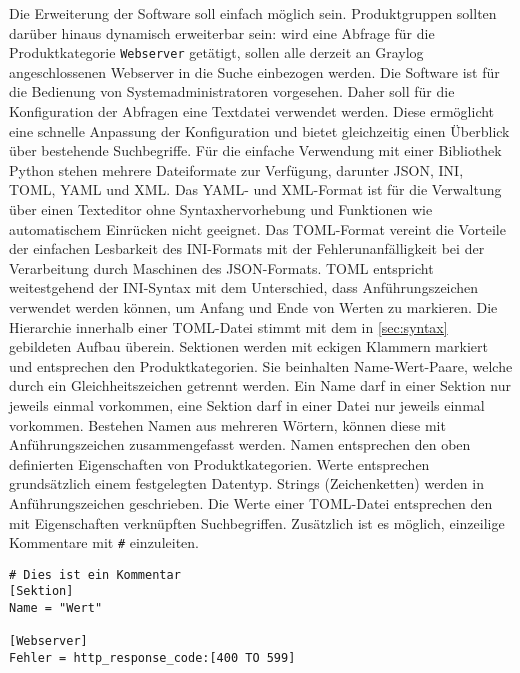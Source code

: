 Die Erweiterung der Software soll einfach möglich sein. Produktgruppen sollten darüber hinaus dynamisch erweiterbar sein: wird eine Abfrage für die Produktkategorie \lstinline{Webserver} getätigt, sollen alle derzeit an Graylog angeschlossenen Webserver in die Suche einbezogen werden. Die Software ist für die Bedienung von Systemadministratoren vorgesehen. Daher soll für die Konfiguration der Abfragen eine Textdatei verwendet werden. Diese ermöglicht eine schnelle Anpassung der Konfiguration und bietet gleichzeitig einen Überblick über bestehende Suchbegriffe. Für die einfache Verwendung mit einer Bibliothek Python stehen mehrere Dateiformate zur Verfügung, darunter JSON, INI, TOML, YAML und XML. Das YAML- und XML-Format ist für die Verwaltung über einen Texteditor ohne Syntaxhervorhebung und Funktionen wie automatischem Einrücken nicht geeignet. Das TOML-Format vereint die Vorteile der einfachen Lesbarkeit des INI-Formats mit der Fehlerunanfälligkeit bei der Verarbeitung durch Maschinen des JSON-Formats. TOML entspricht weitestgehend der INI-Syntax mit dem Unterschied, dass Anführungszeichen verwendet werden können, um Anfang und Ende von Werten zu markieren. Die Hierarchie innerhalb einer TOML-Datei stimmt mit dem in \autoref{sec:syntax} gebildeten Aufbau überein. Sektionen werden mit eckigen Klammern markiert und entsprechen den Produktkategorien. Sie beinhalten Name-Wert-Paare, welche durch ein Gleichheitszeichen getrennt werden. Ein Name darf in einer Sektion nur jeweils einmal vorkommen, eine Sektion darf in einer Datei nur jeweils einmal vorkommen. Bestehen Namen aus mehreren Wörtern, können diese mit Anführungszeichen zusammengefasst werden. Namen entsprechen den oben definierten Eigenschaften von Produktkategorien. Werte entsprechen grundsätzlich einem festgelegten Datentyp. Strings (Zeichenketten) werden in Anführungszeichen geschrieben. Die Werte einer TOML-Datei entsprechen den mit Eigenschaften verknüpften Suchbegriffen. Zusätzlich ist es möglich, einzeilige Kommentare mit \lstinline{#} einzuleiten.

\begin{lstlisting}[caption={Beispiel der TOML-Syntax.}, label=toml-syntax]
# Dies ist ein Kommentar
[Sektion]
Name = "Wert"

[Webserver]
Fehler = http_response_code:[400 TO 599] 
\end{lstlisting}
